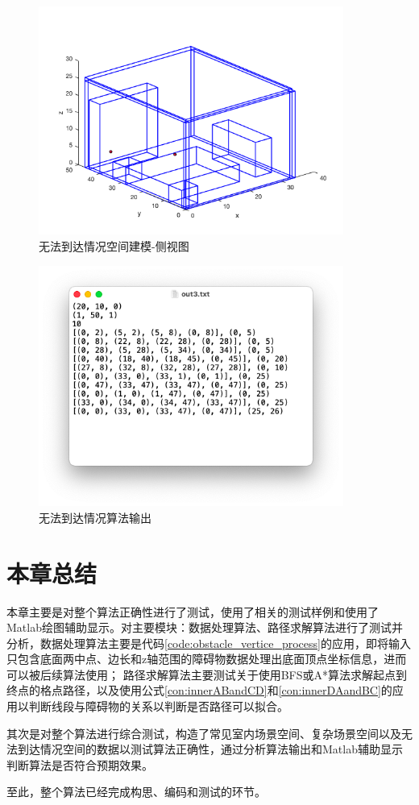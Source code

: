\begin{figure}[htb]
    \centering
    \caption{无法到达情况空间建模-侧视图}
    \label{fig:test_not_situation_pic_lean}
    \includegraphics[width=10cm]{figures/test_not_situation_pic_lean.png}
\end{figure}
\begin{figure}[htb]
    \centering
    \caption{无法到达情况算法输出}
    \label{fig:test_not_situation_out}
    \includegraphics[width=10cm]{figures/test_not_situation_out.png}
\end{figure}

\section{本章总结}
\par{\kaishu 本章主要是对整个算法正确性进行了测试，使用了相关的测试样例和使用了Matlab绘图辅助显示。对主要模块：数据处理算法、路径求解算法进行了测试并分析，数据处理算法主要是代码\ref{code:obstacle_vertice_process}的应用，即将输入只包含底面两中点、边长和z轴范围的障碍物数据处理出底面顶点坐标信息，进而可以被后续算法使用；
路径求解算法主要测试关于使用BFS或A*算法求解起点到终点的格点路径，以及使用公式\ref{con:innerABandCD}和\ref{con:innerDAandBC}的应用以判断线段与障碍物的关系以判断是否路径可以拟合。
\par 其次是对整个算法进行综合测试，构造了常见室内场景空间、复杂场景空间以及无法到达情况空间的数据以测试算法正确性，通过分析算法输出和Matlab辅助显示判断算法是否符合预期效果。
\par 至此，整个算法已经完成构思、编码和测试的环节。}